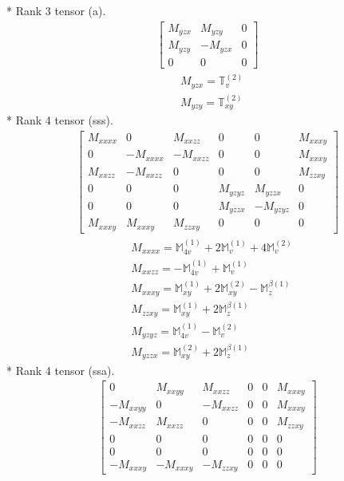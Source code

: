\documentclass[fleqn,8pt,landscape]{jsarticle}
\begin{document}
* Rank 3 tensor (a).
\begin{align*}
\begin{bmatrix} M_{yzx} & M_{yzy} & 0 \\ M_{yzy} & - M_{yzx} & 0 \\ 0 & 0 & 0 \end{bmatrix}
\end{align*}
\begin{align*}
& M_{yzx} = \mathbb{T}_{v}^{(2)} \\
& M_{yzy} = \mathbb{T}_{xy}^{(2)}
\end{align*}
* Rank 4 tensor (sss).
\begin{align*}
\begin{bmatrix} M_{xxxx} & 0 & M_{xxzz} & 0 & 0 & M_{xxxy} \\ 0 & - M_{xxxx} & - M_{xxzz} & 0 & 0 & M_{xxxy} \\ M_{xxzz} & - M_{xxzz} & 0 & 0 & 0 & M_{zzxy} \\ 0 & 0 & 0 & M_{yzyz} & M_{yzzx} & 0 \\ 0 & 0 & 0 & M_{yzzx} & - M_{yzyz} & 0 \\ M_{xxxy} & M_{xxxy} & M_{zzxy} & 0 & 0 & 0 \end{bmatrix}
\end{align*}
\begin{align*}
& M_{xxxx} = \mathbb{M}_{4v}^{(1)} + 2 \mathbb{M}_{v}^{(1)} + 4 \mathbb{M}_{v}^{(2)} \\
& M_{xxzz} = - \mathbb{M}_{4v}^{(1)} + \mathbb{M}_{v}^{(1)} \\
& M_{xxxy} = \mathbb{M}_{xy}^{(1)} + 2 \mathbb{M}_{xy}^{(2)} - \mathbb{M}_{z}^{\beta(1)} \\
& M_{zzxy} = \mathbb{M}_{xy}^{(1)} + 2 \mathbb{M}_{z}^{\beta(1)} \\
& M_{yzyz} = \mathbb{M}_{4v}^{(1)} - \mathbb{M}_{v}^{(2)} \\
& M_{yzzx} = \mathbb{M}_{xy}^{(2)} + 2 \mathbb{M}_{z}^{\beta(1)}
\end{align*}
* Rank 4 tensor (ssa).
\begin{align*}
\begin{bmatrix} 0 & M_{xxyy} & M_{xxzz} & 0 & 0 & M_{xxxy} \\ - M_{xxyy} & 0 & - M_{xxzz} & 0 & 0 & M_{xxxy} \\ - M_{xxzz} & M_{xxzz} & 0 & 0 & 0 & M_{zzxy} \\ 0 & 0 & 0 & 0 & 0 & 0 \\ 0 & 0 & 0 & 0 & 0 & 0 \\ - M_{xxxy} & - M_{xxxy} & - M_{zzxy} & 0 & 0 & 0 \end{bmatrix}
\end{align*}
\end{document}
